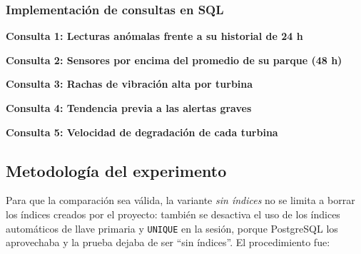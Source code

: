 \subsubsection{Implementación de consultas en SQL}

\textbf{Consulta 1: Lecturas anómalas frente a su historial de 24 h}


\textbf{Consulta 2: Sensores por encima del promedio de su parque (48 h)}


\textbf{Consulta 3: Rachas de vibración alta por turbina}


\textbf{Consulta 4: Tendencia previa a las alertas graves}


\textbf{Consulta 5: Velocidad de degradación de cada turbina}


\subsection{Metodología del experimento}

Para que la comparación sea válida, la variante \emph{sin índices} no se limita
a borrar los índices creados por el proyecto: también se desactiva el uso de los
índices automáticos de llave primaria y \texttt{UNIQUE} en la sesión, porque
PostgreSQL los aprovechaba y la prueba dejaba de ser ``sin índices''. El
procedimiento fue:

